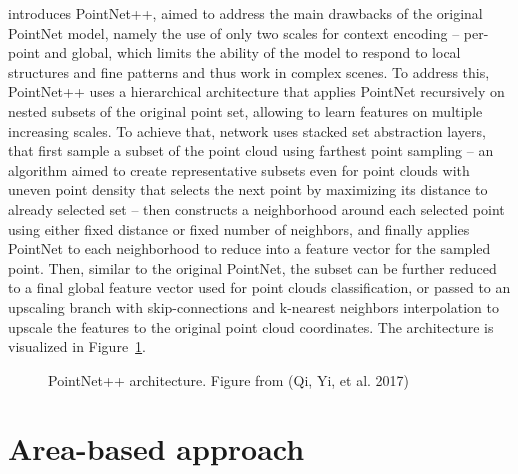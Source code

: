 \citet{qiPointNetPlusPlus2017} introduces PointNet++, aimed to address the main drawbacks of the original PointNet model, namely the use of only two scales for context encoding – per-point and global, which limits the ability of the model to respond to local structures and fine patterns and thus work in complex scenes.
To address this, PointNet++ uses a hierarchical architecture that applies PointNet recursively on nested subsets of the original point set, allowing to learn features on multiple increasing scales.
To achieve that, network uses stacked set abstraction layers, that first sample a subset of the point cloud using farthest point sampling – an algorithm aimed to create representative subsets even for point clouds with uneven point density that selects the next point by maximizing its distance to already selected set – then constructs a neighborhood around each selected point using either fixed distance or fixed number of neighbors, and finally applies PointNet to each neighborhood to reduce into a feature vector for the sampled point.
Then, similar to the original PointNet, the subset can be further reduced to a final global feature vector used for point clouds classification, or passed to an upscaling branch with skip-connections and k-nearest neighbors interpolation to upscale the features to the original point cloud coordinates.
The architecture is visualized in Figure~\ref{fig-pointnet2-architecture}.

\begin{figure}
\caption{\label{fig-pointnet2-architecture}PointNet++ architecture.
Figure from (Qi, Yi, et al. 2017)}
\end{figure}

\section{Area-based approach}\label{sec-area-based-approach}

